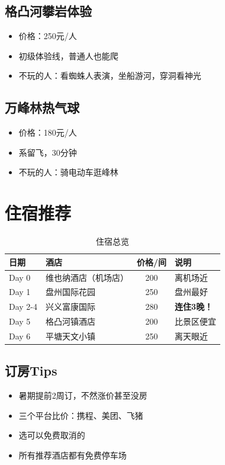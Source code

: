 \documentclass[12pt,a4paper,UTF8]{ctexart}
\begin{document}
\subsection{格凸河攀岩体验}
\begin{itemize}
\item 价格：250元/人
\item 初级体验线，普通人也能爬
\item 不玩的人：看蜘蛛人表演，坐船游河，穿洞看神光
\end{itemize}

\subsection{万峰林热气球}
\begin{itemize}
\item 价格：180元/人
\item 系留飞，30分钟
\item 不玩的人：骑电动车逛峰林
\end{itemize}

\newpage

\section{住宿推荐}

\begin{table}[h]
\centering
\caption{住宿总览}
\begin{tabular}{llcl}
\toprule
日期 & 酒店 & 价格/间 & 说明 \\
\midrule
Day 0 & 维也纳酒店（机场店） & 200 & 离机场近 \\
Day 1 & 盘州国际花园 & 250 & 盘州最好 \\
Day 2-4 & 兴义富康国际 & 280 & \textbf{连住3晚！} \\
Day 5 & 格凸河镇酒店 & 200 & 比景区便宜 \\
Day 6 & 平塘天文小镇 & 250 & 离天眼近 \\
\bottomrule
\end{tabular}
\end{table}

\subsection{订房Tips}
\begin{itemize}
\item 暑期提前2周订，不然涨价甚至没房
\item 三个平台比价：携程、美团、飞猪
\item 选可以免费取消的
\item 所有推荐酒店都有免费停车场
\end{itemize}
\end{document}
